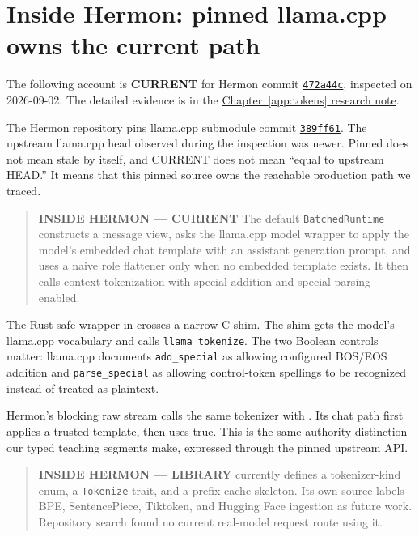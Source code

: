 \section{Inside Hermon: pinned llama.cpp owns the current
path}\label{inside-hermon-pinned-llama.cpp-owns-the-current-path}

The following account is \textbf{CURRENT} for Hermon commit
\href{https://github.com/hermonai/hermon/commit/472a44cdb511b2dae6c9569e59543db8f8350b25}{\texttt{472a44c}},
inspected on 2026-09-02. The detailed evidence is in the
\href{https://github.com/hermonai/inside-the-llm-engine/blob/astra-visual-rewrite/research/part-01/chapter-02-from-text-to-tokens.md}{Chapter~\ref{app:tokens} research note}.

The Hermon repository pins llama.cpp submodule commit
\href{https://github.com/ggml-org/llama.cpp/commit/389ff61d77b5c71cec0cf92fe4e5d01ace80b797}{\texttt{389ff61}}.
The upstream llama.cpp head observed during the inspection was newer.
Pinned does not mean stale by itself, and CURRENT does not mean ``equal
to upstream HEAD.'' It means that this pinned source owns the reachable
production path we traced.

\begin{quote}
\textbf{INSIDE HERMON --- CURRENT} The default \texttt{BatchedRuntime}
constructs a message view, asks the llama.cpp model wrapper to apply the
model's embedded chat template with an assistant generation prompt, and
uses a naive role flattener only when no embedded template exists. It
then calls context tokenization with special addition and special
parsing enabled.
\end{quote}

The Rust safe wrapper in
\texttt{} crosses a narrow C
shim. The shim gets the model's llama.cpp vocabulary and calls
\texttt{llama\_tokenize}. The two Boolean controls matter: llama.cpp
documents \texttt{add\_special} as allowing configured BOS/EOS addition
and \texttt{parse\_special} as allowing control-token spellings to be
recognized instead of treated as plaintext.

Hermon's blocking raw stream calls the same tokenizer with
\texttt{}. Its chat path first applies a
trusted template, then uses true. This is the same authority distinction
our typed teaching segments make, expressed through the pinned upstream
API.

\begin{quote}
\textbf{INSIDE HERMON --- LIBRARY}
\texttt{} currently defines a
tokenizer-kind enum, a \texttt{Tokenize} trait, and a prefix-cache
skeleton. Its own source labels BPE, SentencePiece, Tiktoken, and
Hugging Face ingestion as future work. Repository search found no
current real-model request route using it.
\end{quote}


